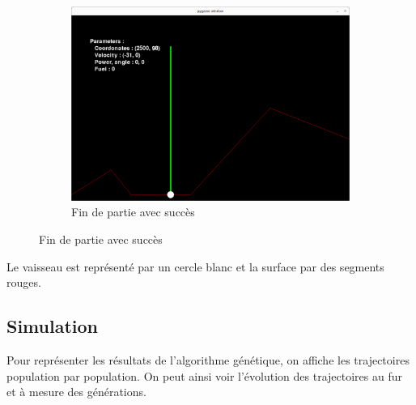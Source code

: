 \documentclass[french,a4paper,10pt,twocolumn]{article}
\begin{document}
\begin{figure}[H]
\begin{subfigure}[b]{0.3\textwidth}
        \includegraphics[width=\textwidth]{images/successful_lvl_one_manual.png}
        \caption{Fin de partie avec succès}
    \end{subfigure}
\end{figure}

Le vaisseau est représenté par un cercle blanc et la surface par des segments rouges.

\subsection{Simulation}

Pour représenter les résultats de l'algorithme génétique, on affiche les trajectoires population par population.
On peut ainsi voir l'évolution des trajectoires au fur et à mesure des générations.
\end{document}
